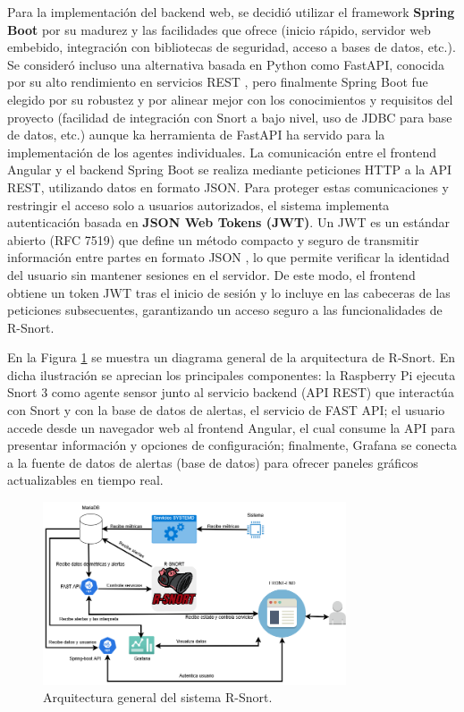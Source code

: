 \documentclass[11pt,a4paper,twoside]{report}
\begin{document}
Para la implementación del backend web, se decidió utilizar el framework \textbf{Spring Boot} por su madurez y las facilidades que ofrece (inicio rápido, servidor web embebido, integración con bibliotecas de seguridad, acceso a bases de datos, etc.). Se consideró incluso una alternativa basada en Python como FastAPI, conocida por su alto rendimiento en servicios REST \cite{FastAPI}, pero finalmente Spring Boot fue elegido por su robustez y por alinear mejor con los conocimientos y requisitos del proyecto (facilidad de integración con Snort a bajo nivel, uso de JDBC para base de datos, etc.) aunque ka herramienta de FastAPI ha servido para la implementación de los agentes individuales. La comunicación entre el frontend Angular y el backend Spring Boot se realiza mediante peticiones HTTP a la API REST, utilizando datos en formato JSON. Para proteger estas comunicaciones y restringir el acceso solo a usuarios autorizados, el sistema implementa autenticación basada en \textbf{JSON Web Tokens (JWT)}. Un JWT es un estándar abierto (RFC 7519) que define un método compacto y seguro de transmitir información entre partes en formato JSON \cite{JWT}, lo que permite verificar la identidad del usuario sin mantener sesiones en el servidor. De este modo, el frontend obtiene un token JWT tras el inicio de sesión y lo incluye en las cabeceras de las peticiones subsecuentes, garantizando un acceso seguro a las funcionalidades de R-Snort.\newline

En la Figura \ref{fig:arquitectura} se muestra un diagrama general de la arquitectura de R-Snort. En dicha ilustración se aprecian los principales componentes: la Raspberry Pi ejecuta Snort 3 como agente sensor junto al servicio backend (API REST) que interactúa con Snort y con la base de datos de alertas, el servicio de FAST API; el usuario accede desde un navegador web al frontend Angular, el cual consume la API para presentar información y opciones de configuración; finalmente, Grafana se conecta a la fuente de datos de alertas (base de datos) para ofrecer paneles gráficos actualizables en tiempo real.\newline

\begin{figure}[hbtp]
	\centering
	 \includegraphics[width=0.8\textwidth]{documento/5.png}
	\caption{Arquitectura general del sistema R-Snort.}
	\label{fig:arquitectura}
\end{figure}
\end{document}
